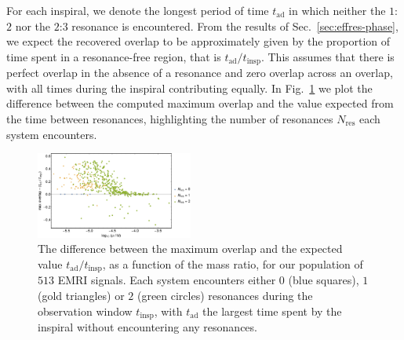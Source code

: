 \documentclass[aps,prd,amsfonts,amssymb,amsmath,nofootinbib,showpacs,superscriptaddress,twocolumn]{revtex4}
\newcommand{\figref}[1]{Fig.~\ref{fig:#1}}
\newcommand{\secref}[1]{Sec.~\ref{sec:#1}}
\newcommand{\sub}[1]{\ensuremath{_\mathrm{#1}}}
\begin{document}

For each inspiral, we denote the longest period of time $t\sub{ad}$ in which neither the $1$:$2$ nor the $2$:$3$ resonance is encountered. From the results of \secref{effres-phase}, we expect the recovered overlap to be approximately given by the proportion of time spent in a resonance-free region, that is $t\sub{ad} / t\sub{insp}$. This assumes that there is perfect overlap in the absence of a resonance and zero overlap across an overlap, with all times during the inspiral contributing equally. 
In \figref{pop-adSNR-vs-eta} we plot the difference between the computed maximum overlap and the value expected from the time between resonances, highlighting the number of resonances $N\sub{res}$ each system encounters.

\begin{figure}
\centering
\includegraphics[width=0.46\textwidth]{pop_adSNR_vs_eta}
\caption{\label{fig:pop-adSNR-vs-eta}The difference between the maximum overlap and the expected value $t\sub{ad} / t\sub{insp}$, as a function of the mass ratio, for our population of $513$ EMRI signals. Each system encounters either $0$ (blue squares), $1$ (gold triangles) or $2$ (green circles) resonances during the observation window $t\sub{insp}$, with $t\sub{ad}$ the largest time spent by the inspiral without encountering any resonances.}
\end{figure}
\end{document}
